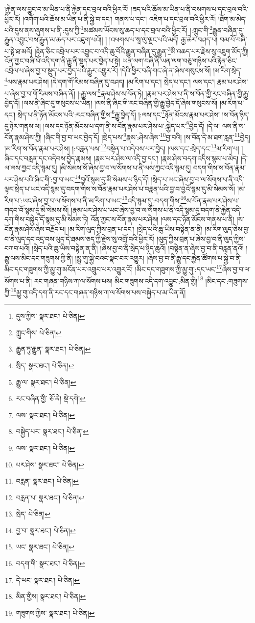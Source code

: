 །རྐྱེན་ལས་བྱུང་བ་མ་ཡིན་པ་ནི་རྐྱེན་དང་བྲལ་བའི་ཕྱིར་རོ། །ཟད་པའི་ཆོས་མ་ཡིན་པ་ནི་བསགས་པ་དང་བྲལ་བའི་ཕྱིར་རོ། །འགོག་པའི་ཆོས་མ་ཡིན་པ་ནི་སྐྱེ་བ་དང་། གནས་པ་དང་། འཇིག་པ་དང་བྲལ་བའི་ཕྱིར་རོ། །ཐོག་མ་མེད་པའི་དུས་ནས་ཞུགས་པ་ནི་:དུས་ཀྱི་\footnote{དུས་ཀྱིས་  སྣར་ཐང་།  པེ་ཅིན། }མཚམས་ཡོངས་སུ་ཆད་པ་དང་བྲལ་བའི་ཕྱིར་རོ། །:ཀླུང་གི་\footnote{ཀླུང་གིས་  པེ་ཅིན། }རྒྱུན་བཞིན་དུ་རྒྱུན་འབྱུང་བས་རྒྱུན་མ་ཆད་པར་འཇུག་པའོ།། །
།འཕགས་པ་སཱ་ལུ་ལྗང་པའི་མདོ། རྒྱ་ཆེར་བཤད་པ། བམ་པོ་བཞི་པ་སྟེ་ཐ་མའོ། །རྟེན་ཅིང་འབྲེལ་པར་འབྱུང་བ་འདི་ཆུ་བོའི་རྒྱུན་བཞིན་དུ་རྒྱུན་\footnote{རྒྱུན་ཏུ་རྒྱུན་  སྣར་ཐང་།  པེ་ཅིན། }མི་འཆད་པར་རྗེས་སུ་འཇུག་མོད་ཀྱི། འོན་ཀྱང་བཞི་པོ་འདི་དག་ནི་རྒྱུ་ནི་སྡུད་པར་བྱེད་པ་སྟེ། ཡན་ལག་བཞི་ནི་ཡན་ལག་བཅུ་གཉིས་པའི་རྟེན་ཅིང་འབྲེལ་པ་ཞེས་བྱ་བ་སྡུད་པར་བྱེད་པའི་རྒྱུར་འགྱུར་རོ། །དེའི་ཕྱིར་བཞི་གང་ཞེ་ན་ཞེས་གསུངས་སོ། །མ་རིག་སྲེད་\footnote{སྲིད་  སྣར་ཐང་།  པེ་ཅིན། }ལས་རྣམ་པར་ཤེས། །དེ་དག་གོ་རིམས་བཞིན་དུ་བཤད། །མ་རིག་པ་དང་། སྲེད་པ་དང་། ལས་དང་། རྣམ་པར་ཤེས་པ་ཞེས་བྱ་བ་གོ་རིམས་བཞིན་ནོ། །:རྒྱུ་ལས་\footnote{རྒྱུ་ལ་  སྣར་ཐང་།  པེ་ཅིན། }རྣམ་ཤེས་ས་བོན་ཏེ། །རྣམ་པར་ཤེས་པ་ནི་ས་བོན་གྱི་རང་བཞིན་གྱི་རྒྱུ་བྱེད་དོ། །ལས་ནི་ཞིང་དུ་གསུངས་པ་ཡིན། །ལས་ནི་ཞིང་གི་རང་བཞིན་གྱི་རྒྱུ་བྱེད་དོ་ཞེས་གསུངས་སོ། །མ་རིག་པ་དང་། སྲེད་པ་ནི་ཉོན་མོངས་པའི་:རང་བཞིན་གྱིས་\footnote{རང་བཞིན་གྱི་  ཅོ་ནེ།  སྡེ་དགེ། }རྒྱུ་བྱེད་དོ། །:ལས་དང་\footnote{ལས་  སྣར་ཐང་།  པེ་ཅིན། }ཉོན་མོངས་རྣམ་པར་ཤེས། །ས་བོན་ཉིད་དུ་ཉེར་གནས་ལ། །ལས་དང་ཉོན་མོངས་པ་དག་ནི་ས་བོན་རྣམ་པར་ཤེས་པ་:སྐྱེད་པར་\footnote{བསྐྱེད་པར་  སྣར་ཐང་།  པེ་ཅིན། }བྱེད་དོ། །དེ་ལ། ལས་ནི་ས་བོན་རྣམ་ཤེས་ཀྱི། །ཞིང་གི་བྱ་བ་ཡང་བྱེད་དོ། །སྲེད་པས་\footnote{ལས་  སྣར་ཐང་།  པེ་ཅིན། }རྣམ་:ཤེས་ཞེས་\footnote{པར་ཤེས་  སྣར་ཐང་།  པེ་ཅིན། }བྱ་བའི། །ས་བོན་དེ་མ་ཐག་རླན་\footnote{བརླན་  སྣར་ཐང་།  པེ་ཅིན། }བྱེད། །མ་རིག་ས་བོན་རྣམ་པར་ཤེས། །:བརླན་པས་\footnote{བརླན་པ་  སྣར་ཐང་།  པེ་ཅིན། }བསྟེན་པ་འདེབས་པར་བྱེད། །ལས་དང་:སྲེད་དང་\footnote{སྲེད་  པེ་ཅིན། }མ་རིག་པ། །ཞིང་དང་བརླན་དང་འདེབས་བྱེད་རྣམས། །རྣམ་པར་ཤེས་ལ་འདི་བྱ་དང་། །རྣམ་ཤེས་བདག་འདིས་སྙམ་པ་མེད། །དེ་ལ་ལས་ཀྱང་འདི་སྙམ་དུ། །མི་སེམས་སོ་ཞེས་བྱ་བ་ལ་སོགས་པ་ནི་ལས་ཀྱང་འདི་སྙམ་དུ། བདག་གིས་ས་བོན་རྣམ་པར་ཤེས་པའི་ཞིང་གི་:བྱ་བ་ཡང་\footnote{བྱ་བ་  སྣར་ཐང་།  པེ་ཅིན། }བྱའོ་སྙམ་དུ་མི་སེམས་པ་ཉིད་དོ། །སྲེད་པ་ཡང་ཞེས་བྱ་བ་ལ་སོགས་པ་ནི་འདི་ལྟར་སྲེད་པ་ཡང་འདི་སྙམ་དུ་བདག་གིས་ས་བོན་རྣམ་པར་ཤེས་པ་བརླན་པའི་བྱ་བ་བྱའོ་སྙམ་དུ་མི་སེམས་སོ། །མ་རིག་པ་:ཡང་ཞེས་བྱ་བ་ལ་སོགས་པ་ནི་མ་རིག་པ་ཡང་\footnote{ཡང་  སྣར་ཐང་།  པེ་ཅིན། }འདི་སྙམ་དུ་:བདག་གིས་\footnote{བདག་གི་  སྣར་ཐང་།  པེ་ཅིན། }ས་བོན་རྣམ་པར་ཤེས་པ་གདབ་བོ་སྙམ་དུ་མི་སེམས་སོ། །རྣམ་པར་ཤེས་པ་ཡང་ཞེས་བྱ་བ་ལ་སོགས་པ་ནི་འདི་སྙམ་དུ་བདག་ནི་རྐྱེན་འདི་དག་གིས་བསྐྱེད་དོ་སྙམ་དུ་མི་སེམས་ཏེ། འོན་ཀྱང་ས་བོན་རྣམ་པར་ཤེས། །ལས་དང་ཉོན་མོངས་གནས་པ་ནི། །ས་བོན་རྣམ་ཤེས་ཞེས་བརྗོད་པ། །མ་རིག་ལུད་ཀྱིས་བྲན་པ་དང་། །སྲེད་པའི་ཆུ་ཡིས་བསྟེན་ན་ནི། །མ་རིག་ལུད་ཅེས་བྱ་བ་ནི་ལུད་དང་འདྲ་བས་ལུད་དེ་ཐམས་ཅད་ཀྱི་རྗེས་སུ་འགྲོ་བའི་ཕྱིར་རོ། །ལུད་ཀྱིས་བྲན་པ་ཞེས་བྱ་བ་ནི་ལུད་ཀྱིས་བཀབ་པའོ། །སྲེད་པའི་ཆུ་ཡིས་བསྟེན་ན་ནི། །ཞེས་བྱ་བ་ནི་སྲེད་པ་ཉིད་ཆུའོ། །བསྟེན་ན་ཞེས་བྱ་བ་ནི་བརླན་ནའོ། །རྒྱུ་ལས་མིང་དང་གཟུགས་ཀྱི་ནི། །མྱུ་གུ་སྐྱེ་བའང་སྣང་བར་འགྱུར། །ཞེས་བྱ་བ་ནི་རྒྱུ་དང་རྐྱེན་ཚོགས་པ་སྐྱེ་བ་ནི་མིང་དང་གཟུགས་ཀྱི་མྱུ་གུ་མངོན་པར་འགྲུབ་པར་འགྱུར་རོ། །མིང་དང་གཟུགས་ཀྱི་མྱུ་གུ་:དང་ཡང་\footnote{དེ་ཡང་  སྣར་ཐང་།  པེ་ཅིན། }ཞེས་བྱ་བ་ལ་སོགས་པ་ནི། རང་གཞན་གཉིས་ཀ་ལ་སོགས་པས། མིང་གཟུགས་འདི་དག་འབྱུང་:མིན་གྱི།\footnote{མིན་གྱིས།  སྣར་ཐང་།  པེ་ཅིན། } །མིང་དང་:གཟུགས་ཀྱི་\footnote{གཟུགས་ཀྱིས་  སྣར་ཐང་།  པེ་ཅིན། }མྱུ་གུ་འདི་དག་ནི་རང་དང་གཞན་གཉིས་ཀ་ལ་སོགས་པས་བསྐྱེད་པ་མ་ཡིན་ནོ། 